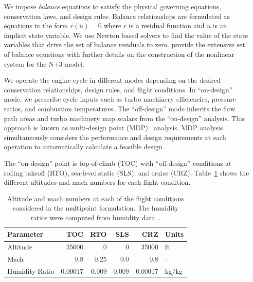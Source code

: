 \documentclass[conf]{new-aiaa}
\begin{document}
We impose \emph{balance} equations to satisfy the physical governing equations, conservation laws, and design rules.
Balance relationships are formulated as equations in the form $r(u)=0$ where $r$ is a residual function and $u$ is an implicit state variable.
We use Newton based solvers to find the value of the state variables that drive the set of balance residuals to zero.
\citeauthor{Hendricks2019} provide the extensive set of balance equations with further details on the construction of the nonlinear system for the N+3 model.

We operate the engine cycle in different modes depending on the desired conservation relationships, design rules, and flight conditions.
In ``on-design'' mode, we prescribe cycle inputs such as turbo machinery efficiencies, pressure ratios, and combustion temperatures.
The ``off-design'' mode inherits the flow path areas and turbo machinery map scalars from the ``on-design'' analysis.
This approach is known as multi-design point (MDP)~\cite{Schutte2009} analysis.
MDP analysis simultaneously considers the performance and design requirements at each operation to automatically calculate a feasible design.

The ``on-design'' point is top-of-climb (TOC) with ``off-design'' conditions at rolling takeoff (RTO), sea-level static (SLS), and cruise (CRZ).
Table~\ref{tab:flight_conds} shows the different altitudes and mach numbers for each flight condition.

\begin{table}[hbt!]
  \centering
  \caption{Altitude and mach numbers at each of the flight conditions considered in the multipoint formulation.
    The humidity ratios were computed from humidity data~\cite{Kalnay1996}.
  }
  \begin{tabular}{l r r r r l}
    \hline
    Parameter      & TOC     & RTO   & SLS   & CRZ     & Units      \\
    \hline
    Altitude       & 35000   & 0     & 0     & 35000   & \si{ft}    \\
    Mach           & 0.8     & 0.25  & 0.0   & 0.8     & -          \\
    Humidity Ratio & 0.00017 & 0.009 & 0.009 & 0.00017 & \si{kg/kg} \\
    \hline
  \end{tabular}
  \label{tab:flight_conds}
\end{table}
\end{document}
